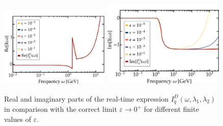  \begin{figure}[t] 
\hfill
	\centering
	\includegraphics[width = 0.465\textwidth, trim= 4em 0 0 0]{figs/plots/ReContCheck}
\hfill
	\includegraphics[width = 0.52\textwidth, trim= 0 0.2em 0 0]{figs/plots/ImContCheck}
\hfill
\caption{Real and imaginary parts of the real-time expression $I_q^{D}\left(\omega,\lambda_1,\lambda_2\right)$ in comparison with the correct limit $\varepsilon\rightarrow 0^+$ for different finite values of $\varepsilon$.}
	\label{fig:continuation}
\end{figure}

